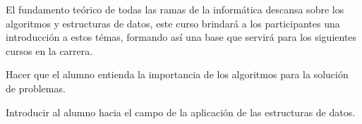 \begin{syllabus}


\begin{justification}
El fundamento teórico de todas las ramas de la informática descansa sobre los algoritmos y estructuras de datos, este curso brindará a los participantes una introducción a estos témas, formando así­ una base que servirá para los siguientes cursos en la carrera.
\end{justification}

\begin{goals}
\item Hacer que el alumno entienda la importancia de los algoritmos para la solución de problemas.
\item Introducir al alumno hacia el campo de la aplicación de las estructuras de datos.
\end{goals}

\begin{outcomes}
    \item {}
    \item {}
    \item {}
    \item {}
    \item {}
\end{outcomes}

\begin{competences}
    \item {} 
    \item {}
    \item {}
    \item {}
    \item {}
    \item {}
    
\end{competences}


\end{syllabus}
